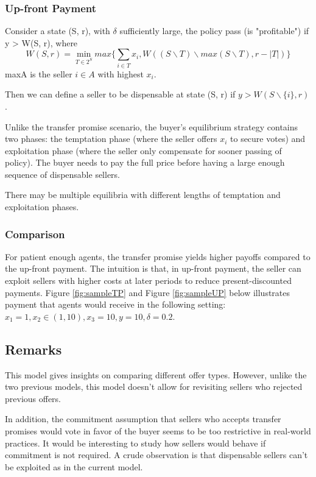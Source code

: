\documentclass[ProjectGAZ]{subfiles}
\begin{document}
\subsubsection{Up-front Payment}

Consider a state (S, r), with $\delta$ sufficiently large, the policy pass (is "profitable") if y > W(S, r), where
\begin{equation}
	W(S, r) = \min_{T \in 2^S} max \{\sum_{i \in T} x_i, W((S \backslash T) \backslash max(S\backslash T), r - |T|)\}
\end{equation} 
maxA is the seller $i\in A$ with highest $x_i$.

Then we can define a seller to be dispensable at state (S, r) if $y > W(S\backslash \{i\}, r)$.

Unlike the transfer promise scenario, the buyer's equilibrium strategy contains two phases: the temptation phase (where the seller offers $x_i$ to secure votes) and exploitation phase (where the seller only compensate for sooner passing of policy). The buyer needs to pay the full price before having a large enough sequence of dispensable sellers.

There may be multiple equilibria with different lengths of temptation and exploitation phases.

\subsubsection{Comparison}

For patient enough agents, the transfer promise yields higher payoffs compared to the up-front payment. The intuition is that, in up-front payment, the seller can exploit sellers with higher costs at later periods to reduce present-discounted payments. Figure \ref{fig:sampleTP} and Figure \ref{fig:sampleUP} below illustrates payment that agents would receive in the following setting: $x_1 = 1, x_2 \in (1, 10), x_3 = 10, y = 10, \delta = 0.2$.






\subsection{Remarks}

This model gives insights on comparing different offer types. However, unlike the two previous models, this model doesn't allow for revisiting sellers who rejected previous offers.

In addition, the commitment assumption that sellers who accepts transfer promises would vote in favor of the buyer seems to be too restrictive in real-world practices. It would be interesting to study how sellers would behave if commitment is not required. A crude observation is that dispensable sellers can't be exploited as in the current model.
\end{document}
